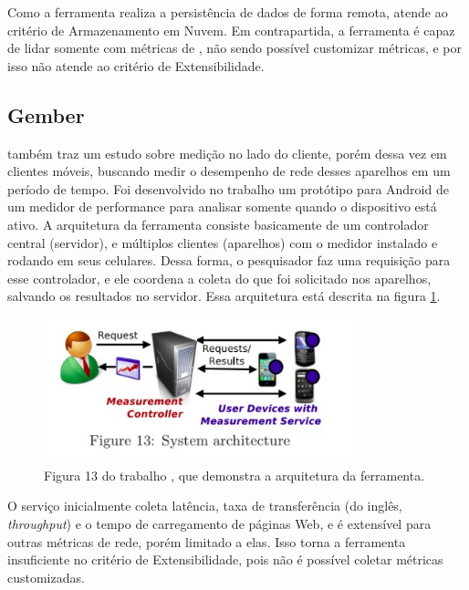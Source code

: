 \documentclass[12pt]{tcc}
\begin{document}
	Como a ferramenta realiza a persistência de dados de forma remota, atende ao critério de Armazenamento em Nuvem. Em contrapartida, a ferramenta é capaz de lidar somente com métricas de , não sendo possível customizar métricas, e por isso não atende ao critério de Extensibilidade.

	\subsection{Gember}
	\par \citet{Gember2012Obtaining} também traz um estudo sobre medição no lado do cliente, porém dessa vez em clientes móveis, buscando medir o desempenho de rede desses aparelhos em um período de tempo. Foi desenvolvido no trabalho um protótipo para Android de um medidor de performance para analisar somente quando o dispositivo está ativo. A arquitetura da ferramenta consiste basicamente de um controlador central (servidor), e múltiplos clientes (aparelhos) com o medidor instalado e rodando em seus celulares. Dessa forma, o pesquisador faz uma requisição para esse controlador, e ele coordena a coleta do que foi solicitado nos aparelhos, salvando os resultados no servidor. Essa arquitetura está descrita na figura \ref{fig:gember}.

	\begin{figure}[!ht]
		\centering
		\includegraphics[width=0.8\textwidth]{figures/gember.jpeg}
		\caption[Fluxo da ferramenta proposta por Gember]{Figura 13 do trabalho \citep{Gember2012Obtaining}, que demonstra a arquitetura da ferramenta. }
		\label{fig:gember}
	\end{figure}

	O serviço inicialmente coleta latência, taxa de transferência (do inglês, \emph{throughput}) e o tempo de carregamento de páginas Web, e é extensível para outras métricas de rede, porém limitado a elas. Isso torna a ferramenta insuficiente no critério de Extensibilidade, pois não é possível coletar métricas customizadas. 
\end{document}
